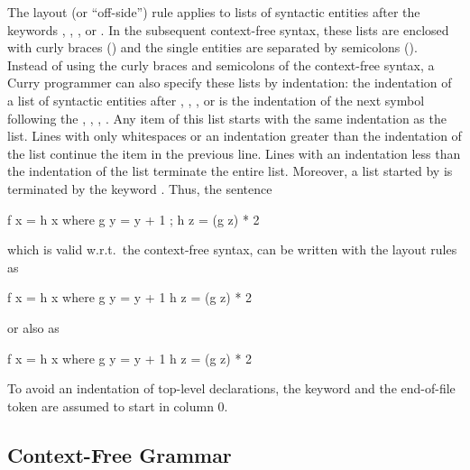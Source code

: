 The layout (or \enquote{off-side}) rule applies to lists of syntactic
entities after the keywords ,
, , or .
In the subsequent context-free syntax,
these lists are enclosed with
curly braces (\term{\{ \}}) and the single entities are
separated by semicolons (\term{;}). Instead of using the curly
braces and semicolons of the context-free syntax,
a Curry programmer can also specify these lists by indentation:
the indentation of a list of syntactic
entities after , , , or  is the
indentation of the next symbol following the
, , , .
Any item of this list starts with the same indentation as the list.
Lines with only whitespaces or an indentation greater
than the indentation of the list continue
the item in the previous line.
Lines with an indentation less than the indentation
of the list terminate the entire list.
Moreover, a list started by  is terminated by the
keyword .
Thus, the sentence
\begin{curry}
f x = h x where { g y = y + 1 ; h z = (g z) * 2 }
\end{curry}
which is valid w.r.t.\ the context-free syntax,
can be written with the layout rules as
\begin{curry}
f x = h x
 where g y = y + 1
       h z = (g z) * 2
\end{curry}
or also as
\begin{curry}
f x = h x  where
  g y = y + 1
  h z = (g z)
          * 2
\end{curry}
To avoid an indentation of top-level declarations,
the keyword  and the end-of-file token are
assumed to start in column 0.

\subsection{Context-Free Grammar}

